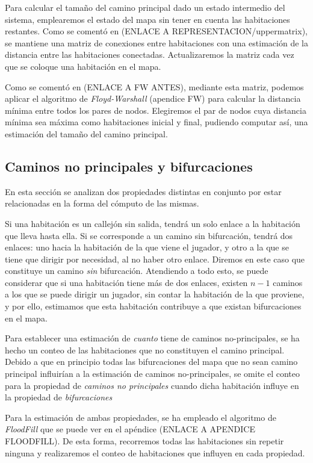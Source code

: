 Para calcular el tamaño del camino principal dado un estado intermedio del sistema, emplearemos el estado del mapa sin tener en cuenta las habitaciones restantes. Como se comentó en (ENLACE A REPRESENTACION/uppermatrix), se mantiene una matriz de conexiones entre habitaciones con una estimación de la distancia entre las habitaciones conectadas. Actualizaremos la matriz cada vez que se coloque una habitación en el mapa.

Como se comentó en (ENLACE A FW ANTES), mediante esta matriz, podemos aplicar el algoritmo de \emph{Floyd-Warshall} (apendice FW) para calcular la distancia mínima entre todos los pares de nodos. Elegiremos el par de nodos cuya distancia mínima sea máxima como habitaciones inicial y final, pudiendo computar así, una estimación del tamaño del camino principal.

\subsection{Caminos no principales y bifurcaciones}

En esta sección se analizan dos propiedades distintas en conjunto por estar relacionadas en la forma del cómputo de las mismas.


Si una habitación es un callejón sin salida, tendrá un solo enlace a la habitación que lleva hasta ella. Si se corresponde a un camino sin bifurcación, tendrá dos enlaces: uno hacia la habitación de la que viene el jugador, y otro a la que se tiene que dirigir por necesidad, al no haber otro enlace. Diremos en este caso que constituye un camino \emph{sin} bifurcación. Atendiendo a todo esto, se puede considerar que si una habitación tiene más de dos enlaces, existen $n-1$ caminos a los que se puede dirigir un jugador, sin contar la habitación de la que proviene, y por ello, estimamos que esta habitación contribuye a que existan bifurcaciones en el mapa.

Para establecer una estimación de \emph{cuanto} tiene de caminos no-principales, se ha hecho un conteo de las habitaciones que no constituyen el camino principal. Debido a que en principio todas las bifurcaciones del mapa que no sean camino principal influirían a la estimación de caminos no-principales, se omite el conteo para la propiedad de \emph{caminos no principales} cuando dicha habitación influye en la propiedad de \emph{bifurcaciones}

Para la estimación de ambas propiedades, se ha empleado el algoritmo de \emph{FloodFill} que se puede ver en el apéndice (ENLACE A APENDICE FLOODFILL). De esta forma, recorremos todas las habitaciones sin repetir ninguna y realizaremos el conteo de habitaciones que influyen en cada propiedad.

